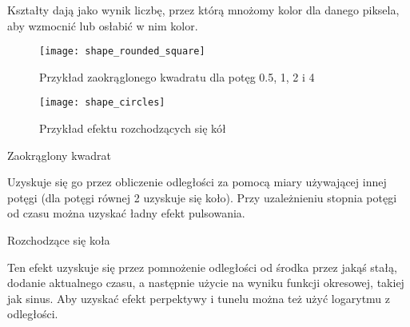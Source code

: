 
Kształty dają jako wynik liczbę, przez którą mnożomy kolor dla danego piksela, aby wzmocnić lub osłabić w nim kolor.

\begin{wrapfigure}{r}{0.3\textwidth}
	\centering
	\noindent\texttt{[image: shape\_rounded\_square]}
	\caption{Przykład zaokrąglonego kwadratu dla potęg 0.5, 1, 2 i 4}
	\noindent\texttt{[image: shape\_circles]}
	\caption{Przykład efektu rozchodzących się kół}
\end{wrapfigure}
{\large Zaokrąglony kwadrat}

Uzyskuje się go przez obliczenie odległo\'sci za pomocą miary używającej innej potęgi (dla potęgi równej 2 uzyskuje się koło). Przy uzależnieniu stopnia potęgi od czasu można uzyskać ładny efekt pulsowania.

{\large Rozchodzące się koła}

Ten efekt uzyskuje się przez pomnożenie odległo\'sci od \'srodka przez jaką\'s stałą, dodanie aktualnego czasu, a następnie użycie na wyniku funkcji okresowej, takiej jak sinus. Aby uzyskać efekt perpektywy i tunelu można też użyć logarytmu z odległo\'sci.


\cleardoublepage